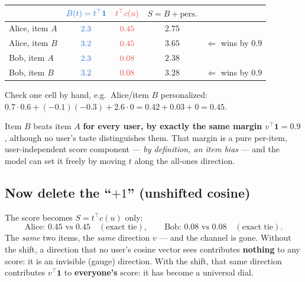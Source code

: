 \documentclass[11pt,a4paper]{article}
\begin{document}
\begin{center}
\begin{tabular}{lcccc}
\toprule
 & $\textcolor{base}{B(t)=t^{\top}\mathbf{1}}$ & $\textcolor{pers}{t^{\top}c(u)}$ & $S = B + \text{pers.}$ & \\
\midrule
Alice, item $A$ & $\textcolor{base}{2.3}$ & $\textcolor{pers}{0.45}$ & $2.75$ & \\
Alice, item $B$ & $\textcolor{base}{3.2}$ & $\textcolor{pers}{0.45}$ & $3.65$ & $\Leftarrow$ wins by $0.9$\\
\midrule
Bob, item $A$   & $\textcolor{base}{2.3}$ & $\textcolor{pers}{0.08}$ & $2.38$ & \\
Bob, item $B$   & $\textcolor{base}{3.2}$ & $\textcolor{pers}{0.08}$ & $3.28$ & $\Leftarrow$ wins by $0.9$\\
\bottomrule
\end{tabular}
\end{center}

Check one cell by hand, e.g.\ Alice/item $B$ personalized:
$0.7\cdot 0.6 + (-0.1)(-0.3) + 2.6\cdot 0 = 0.42+0.03+0 = 0.45$.

Item $B$ beats item $A$ \textbf{for every user, by exactly the same margin
$v^{\top}\mathbf{1}=0.9$}, although no user's taste distinguishes them. That
margin is a pure per-item, user-independent score component --- \emph{by
definition, an item bias} --- and the model can set it freely by moving $t$
along the all-ones direction.

\subsection*{Now delete the ``$+1$'' (unshifted cosine)}

The score becomes $S = t^{\top}c(u)$ only:
\[
\text{Alice: } 0.45 \text{ vs } 0.45 \quad(\text{exact tie}), \qquad
\text{Bob: } 0.08 \text{ vs } 0.08 \quad(\text{exact tie}).
\]
The \emph{same} two items, the \emph{same} direction $v$ --- and the channel is
gone. Without the shift, a direction that no user's cosine vector sees
contributes \textbf{nothing} to any score: it is an invisible (gauge)
direction. With the shift, that same direction contributes
$v^{\top}\mathbf{1}$ to \textbf{everyone's} score: it has become a universal
dial.

\begin{center}
\end{center}
\end{document}
